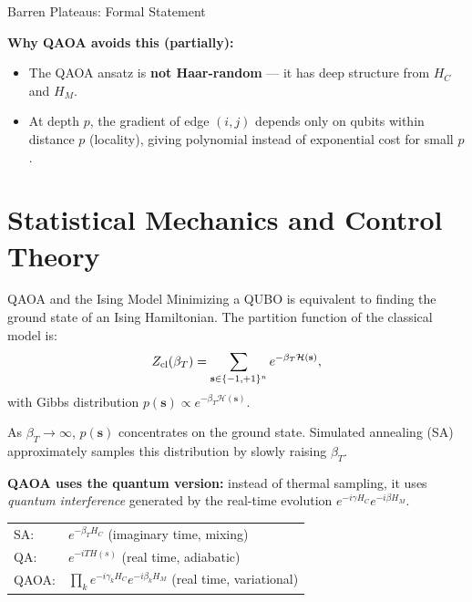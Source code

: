 \documentclass{beamer}
\begin{document}
\begin{frame}
\begin{frame}{Barren Plateaus: Formal Statement}
\medskip

\textbf{Why QAOA avoids this (partially):}
\begin{itemize}
\item The QAOA ansatz is \textbf{not Haar-random} --- it has deep
  structure from $H_C$ and $H_M$.
\item At depth $p$, the gradient of edge $(i,j)$ depends only on
  qubits within distance $p$ (locality), giving polynomial instead of
  exponential cost for small $p$.
\end{itemize}
\end{frame}


\section{Statistical Mechanics and Control Theory}

\begin{frame}{QAOA and the Ising Model}
Minimizing a QUBO is equivalent to finding the ground state of an
Ising Hamiltonian. The partition function of the classical model is:
\[
Z_{\rm cl}(\beta_T) = \sum_{\mathbf{s}\in\{-1,+1\}^n}
e^{-\beta_T \mathcal{H}(\mathbf{s})},
\]
with Gibbs distribution $p(\mathbf{s})\propto e^{-\beta_T\mathcal{H}(\mathbf{s})}$.

\medskip

As $\beta_T\to\infty$, $p(\mathbf{s})$ concentrates on the ground
state. Simulated annealing (SA) approximately samples this
distribution by slowly raising $\beta_T$.

\medskip

\textbf{QAOA uses the quantum version:} instead of thermal sampling,
it uses \emph{quantum interference} generated by the real-time
evolution $e^{-i\gamma H_C}e^{-i\beta H_M}$.

\begin{center}
\begin{tabular}{ll}
\hline
SA: & $e^{-\beta_T H_C}$ (imaginary time, mixing) \\
QA: & $e^{-iT H(s)}$ (real time, adiabatic) \\
QAOA: & $\prod_k e^{-i\gamma_k H_C}e^{-i\beta_k H_M}$ (real time, variational) \\
\hline
\end{tabular}
\end{center}
\end{frame}



\end{frame}
\end{document}
